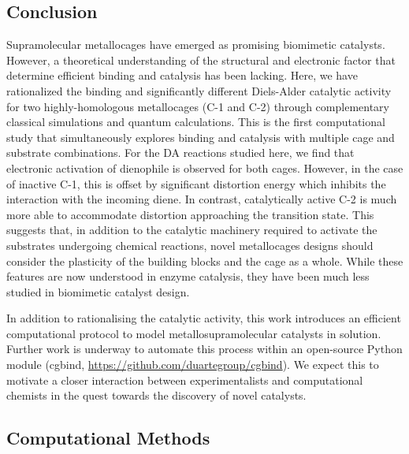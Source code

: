 \documentclass[../../main.tex]{subfiles}
\begin{document}
\subsection{Conclusion}

Supramolecular metallocages have emerged as promising biomimetic catalysts. However, a theoretical understanding of the structural and electronic factor that determine efficient binding and catalysis has been lacking. Here, we have rationalized the binding and significantly different Diels-Alder catalytic activity for two highly-homologous metallocages (C-1 and C-2) through complementary classical simulations and quantum calculations. This is the first computational study that simultaneously explores binding and catalysis with multiple cage and substrate combinations. For the DA reactions studied here, we find that electronic activation of dienophile is observed for both cages. However, in the case of inactive C-1, this is offset by significant distortion energy which inhibits the interaction with the incoming diene. In contrast, catalytically active C-2 is much more able to accommodate distortion approaching the transition state. This suggests that, in addition to the catalytic machinery required to activate the substrates undergoing chemical reactions, novel metallocages designs should consider the plasticity of the building blocks and the cage as a whole. While these features are now understood in enzyme catalysis, they have been much less studied in biomimetic catalyst design.

In addition to rationalising the catalytic activity, this work introduces an efficient computational protocol to model metallosupramolecular catalysts in solution. Further work is underway to automate this process within an open-source Python module (cgbind, {\url{https://github.com/duartegroup/cgbind}}). We expect this to motivate a closer interaction between experimentalists and computational chemists in the quest towards the discovery of novel catalysts. 


\subsection{Computational Methods}
\end{document}

